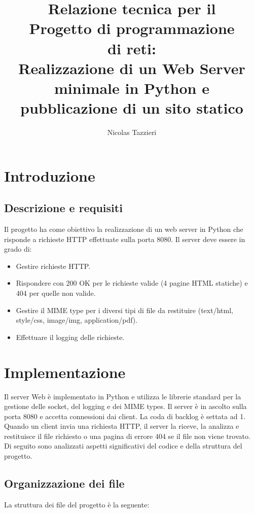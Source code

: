 \documentclass[a4paper,12pt]{report}
\title{\Huge \textbf{Relazione tecnica per il \\ Progetto di programmazione \\ di reti:\\}
\vspace{0.5cm}
\LARGE Realizzazione di un Web Server minimale in Python e pubblicazione di un sito statico
}
\author{
    Nicolas Tazzieri
}
\begin{document}
\maketitle

\newpage

\tableofcontents

\chapter{Introduzione}

\section{Descrizione e requisiti}

Il progetto ha come obiettivo la realizzazione di un web server in Python che risponde a richieste HTTP effettuate sulla porta 8080. Il server deve essere in grado di:
\begin{itemize}
    \item Gestire richieste HTTP.
    \item Rispondere con 200 OK per le richieste valide (4 pagine HTML statiche) e 404 per quelle non valide.
    \item Gestire il MIME type per i diversi tipi di file da restituire (text/html, style/css, image/img, application/pdf).
    \item Effettuare il logging delle richieste.
\end{itemize}


\chapter{Implementazione}

Il server Web è implementato in Python e utilizza le librerie standard per la gestione delle socket, del logging e dei MIME types. Il server è in ascolto sulla porta 8080 e accetta connessioni dai client. La coda di backlog è settata ad 1. Quando un client invia una richiesta HTTP, il server la riceve, la analizza e restituisce il file richiesto o una pagina di errore 404 se il file non viene trovato. Di seguito sono analizzati aspetti significativi del codice e della struttura del progetto.

\section{Organizzazione dei file}
La struttura dei file del progetto è la seguente:
\end{document}
